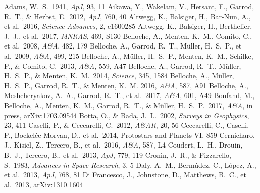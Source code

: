 \documentclass{iau}
\begin{document}
\begin{thebibliography}{}

 Adams, W.~S.\ 1941, \textit{ApJ}, 93, 11 
 Aikawa, Y., Wakelam, V., Hersant, F., 
Garrod, R.~T., \& Herbst, E.\ 2012, \textit{ApJ}, 760, 40
 Altwegg, K., Balsiger, H., 
Bar-Nun, A., et al.\ 2016, \textit{Science Advances}, 2, e1600285
 Altwegg, K., Balsiger, H., 
Berthelier, J.~J., et al.\ 2017, \textit{MNRAS}, 469, S130 
 Belloche, A., Menten, K.~M., 
Comito, C., et al.\ 2008, \textit{A\&A}, 482, 179
 Belloche, A., Garrod, R.~T., 
M{\"u}ller, H.~S.~P., et al.\ 2009, \textit{A\&A}, 499, 215
 Belloche, A., M{\"u}ller, 
H.~S.~P., Menten, K.~M., Schilke, P., \& Comito, C.\ 2013, \textit{A\&A}, 559, 
A47 
 Belloche, A., Garrod, R.~T., 
M{\"u}ller, H.~S.~P., \& Menten, K.~M.\ 2014, \textit{Science}, 345, 1584 
 Belloche, A., M{\"u}ller, 
H.~S.~P., Garrod, R.~T., \& Menten, K.~M. 2016, \textit{A\&A}, 587, A91
 Belloche, A., 
Meshcheryakov, A.~A., Garrod, R.~T., et al.\ 2017, \textit{A\&A}, 601, A49 
 Bonfand, M., Belloche, A., 
Menten, K.~M., Garrod, R.~T., \& M\"uller, H.~S.~P.\ 2017, \textit{A\&A}, in 
press, arXiv:1703.09544 
 Botta, O., \& Bada, J.~L.\ 2002, 
\textit{Surveys in Geophysics}, 23, 411
 Caselli, P., \& Ceccarelli, 
C.\ 2012, \textit{A\&AR}, 20, 56
 Ceccarelli, C., Caselli, P., 
Bockel{\'e}e-Morvan, D., et al.\ 2014, Protostars and Planets VI, 859 
 Cernicharo, J., Kisiel, Z., 
Tercero, B., et al.\ 2016, \textit{A\&A}, 587, L4 
 Coudert, L.~H., Drouin, 
B.~J., Tercero, B., et al.\ 2013, \textit{ApJ}, 779, 119 
 Cronin, J.~R., \& 
Pizzarello, S.\ 1983, \textit{Advances in Space Research}, 3, 5
 Daly, A.~M., Berm{\'u}dez, 
C., L{\'o}pez, A., et al.\ 2013, \textit{ApJ}, 768, 81 
 Di Francesco, J., 
Johnstone, D., Matthews, B.~C., et al.\ 2013, arXiv:1310.1604 

\end{thebibliography}
\end{document}
